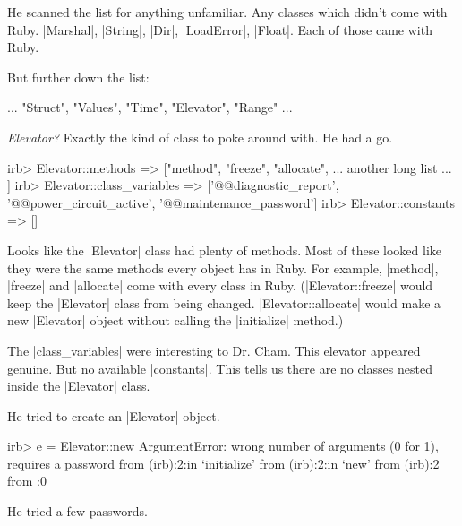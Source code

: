 \documentclass[12pt,twoside]{report}
\begin{document}
He scanned the list for anything unfamiliar.  Any classes which didn't
come with Ruby. \rubyinline|Marshal|,
\rubyinline|String|, \rubyinline|Dir|,
\rubyinline|LoadError|,
\rubyinline|Float|.  Each of those came with Ruby.

But further down the list:


\begin{consolecode}

 ... "Struct", "Values", "Time", "Elevator", "Range" ...

\end{consolecode}


{\em Elevator?}  Exactly the kind of class to poke around with.  He
had a go.


\begin{consolecode}

 irb> Elevator::methods
   => ["method", "freeze", "allocate", ... another long list ... ]
 irb> Elevator::class_variables
   => ['@@diagnostic_report', '@@power_circuit_active', '@@maintenance_password']
 irb> Elevator::constants
   => []

\end{consolecode}


Looks like the \rubyinline|Elevator| class had plenty
of methods.  Most of these looked like they were the same methods
every object has in Ruby.  For example,
\rubyinline|method|,
\rubyinline|freeze| and
\rubyinline|allocate| come with every class in Ruby.
(\rubyinline|Elevator::freeze| would keep the
\rubyinline|Elevator| class from being changed.
\rubyinline|Elevator::allocate| would make a new
\rubyinline|Elevator| object without calling the
\rubyinline|initialize| method.)

The \rubyinline|class_variables| were interesting to
Dr. Cham.  This elevator appeared genuine. But no available
\rubyinline|constants|.  This tells us there are no
classes nested inside the \rubyinline|Elevator| class.

He tried to create an \rubyinline|Elevator| object.


\begin{consolecode}

 irb> e = Elevator::new
 ArgumentError: wrong number of arguments (0 for 1), requires a password
         from (irb):2:in `initialize'
         from (irb):2:in `new'
         from (irb):2
         from :0

\end{consolecode}


He tried a few passwords.
\end{document}
